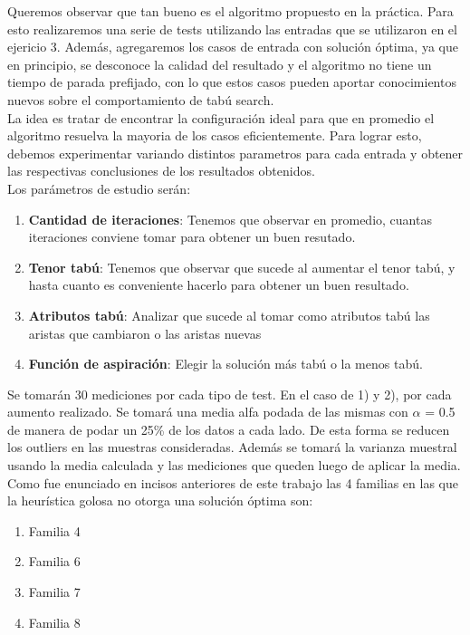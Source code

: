 Queremos observar que tan bueno es el algoritmo propuesto en la práctica. Para esto realizaremos una serie de tests utilizando las entradas que se utilizaron en el ejericio 3. Además, agregaremos los casos de entrada con solución óptima, ya que en principio, se desconoce la calidad del resultado y el algoritmo no tiene un tiempo de parada prefijado, con lo que estos casos pueden aportar conocimientos nuevos sobre el comportamiento de tabú search.\\
La idea es tratar de encontrar la configuración ideal para que en promedio el algoritmo resuelva la mayoria de los casos eficientemente. Para lograr esto, debemos experimentar variando distintos parametros para cada entrada y obtener las respectivas conclusiones de los resultados obtenidos.\\
Los parámetros de estudio serán:

\begin{enumerate}
\item  \textbf{Cantidad de iteraciones}: Tenemos que observar en promedio, cuantas iteraciones conviene tomar para obtener un buen resutado.
\item \textbf{Tenor tabú}: Tenemos que observar que sucede al aumentar el tenor tabú, y hasta cuanto es conveniente hacerlo para obtener un buen resultado.
\item \textbf{Atributos tabú}: Analizar que sucede al tomar como atributos tabú las aristas que cambiaron o las aristas nuevas
\item \textbf{Función de aspiración}: Elegir la solución más tabú o la menos tabú.
\end{enumerate}

Se tomarán 30 mediciones por cada tipo de test. En el caso de 1) y 2), por cada aumento realizado. Se tomará una media alfa podada de las mismas con $\alpha$ = 0.5 de manera de podar un 25\% de los datos a cada lado. De esta forma se reducen los outliers en las muestras consideradas. 
Además se tomará la varianza muestral usando la media calculada y las mediciones que queden luego de aplicar la media.\\

Como fue enunciado en incisos anteriores de este trabajo las 4 familias en las que la heur\'istica golosa no otorga una soluci\'on \'optima son:

\begin{enumerate}
\item Familia 4
\item Familia 6
\item Familia 7
\item Familia 8
\end{enumerate}

